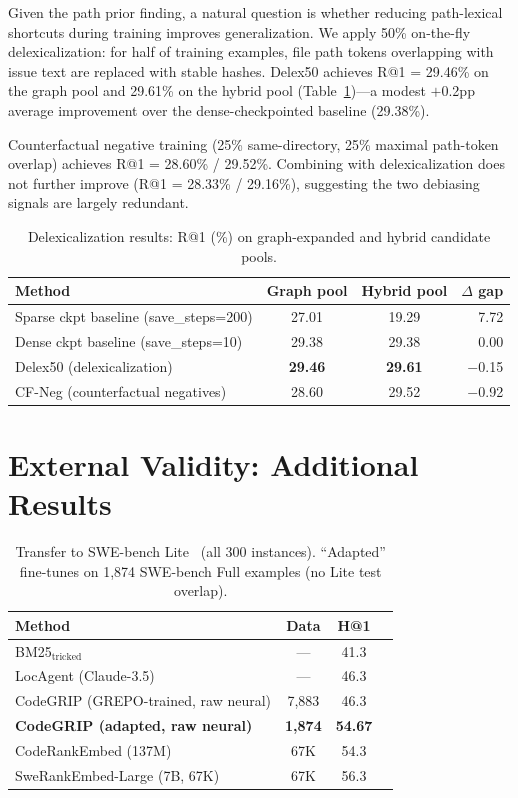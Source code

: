 \documentclass{article}
\begin{document}
Given the path prior finding, a natural question is whether reducing path-lexical shortcuts during training improves generalization.
We apply 50\% on-the-fly delexicalization: for half of training examples, file path tokens overlapping with issue text are replaced with stable hashes.
Delex50 achieves R@1 = 29.46\% on the graph pool and 29.61\% on the hybrid pool (Table~\ref{tab:mitigation})---a modest $+$0.2pp average improvement over the dense-checkpointed baseline (29.38\%).

Counterfactual negative training (25\% same-directory, 25\% maximal path-token overlap) achieves R@1 = 28.60\% / 29.52\%.
Combining with delexicalization does not further improve (R@1 = 28.33\% / 29.16\%), suggesting the two debiasing signals are largely redundant.

\begin{table}[h]
\centering
\caption{Delexicalization results: R@1 (\%) on graph-expanded and hybrid candidate pools.}
\label{tab:mitigation}
\small
\begin{tabular}{lccr}
\toprule
\textbf{Method} & \textbf{Graph pool} & \textbf{Hybrid pool} & \textbf{$\Delta$ gap} \\
\midrule
Sparse ckpt baseline (save\_steps=200) & 27.01 & 19.29 & 7.72 \\
Dense ckpt baseline (save\_steps=10) & 29.38 & 29.38 & 0.00 \\
\midrule
Delex50 (delexicalization) & \textbf{29.46} & \textbf{29.61} & $-$0.15 \\
CF-Neg (counterfactual negatives) & 28.60 & 29.52 & $-$0.92 \\
\bottomrule
\end{tabular}
\end{table}


\section{External Validity: Additional Results}
\label{app:external_validity}

\begin{table}[h]
\centering
\caption{Transfer to SWE-bench Lite~\citep{jimenez2024swebench} (all 300 instances). ``Adapted'' fine-tunes on 1,874 SWE-bench Full examples (no Lite test overlap).}
\label{tab:swebench}
\small
\begin{tabular}{lccc}
\toprule
\textbf{Method} & \textbf{Data} & \textbf{H@1} \\
\midrule
BM25$_{\text{tricked}}$ & --- & 41.3 \\
LocAgent (Claude-3.5) & --- & 46.3 \\
CodeGRIP (GREPO-trained, raw neural) & 7,883 & 46.3 \\
\textbf{CodeGRIP (adapted, raw neural)} & \textbf{1,874} & \textbf{54.67} \\
CodeRankEmbed (137M) & 67K & 54.3 \\
SweRankEmbed-Large (7B, 67K) & 67K & 56.3 \\
\bottomrule
\end{tabular}
\end{table}
\end{document}
